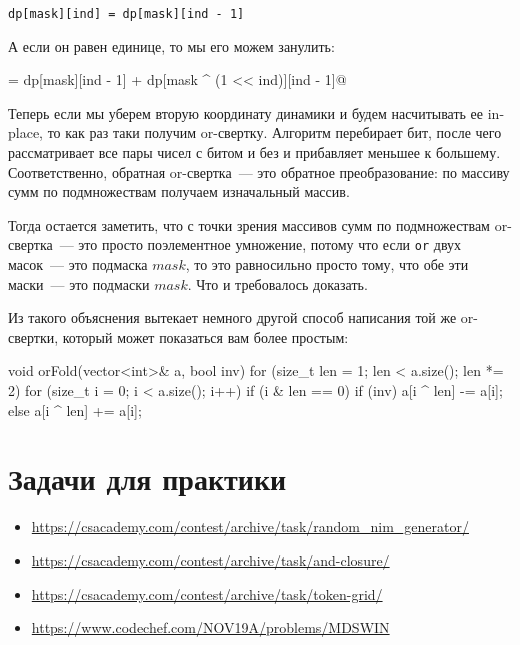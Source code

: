 \verb^dp[mask][ind] = dp[mask][ind - 1]^

А если он равен единице, то мы его можем занулить:

\verb@dp[mask][ind] = dp[mask][ind - 1] + dp[mask ^ (1 << ind)][ind - 1]@

Теперь если мы уберем вторую координату динамики и будем насчитывать ее in-place, то как раз таки получим or-свертку. Алгоритм перебирает бит, после чего рассматривает все пары чисел с битом и без и прибавляет меньшее к большему. Соответственно, обратная or-свертка~--- это обратное преобразование: по массиву сумм по подмножествам получаем изначальный массив.

Тогда остается заметить, что с точки зрения массивов сумм по подмножествам or-свертка~--- это просто поэлементное умножение, потому что если \verb+or+ двух масок~--- это подмаска $mask$, то это равносильно просто тому, что обе эти маски~--- это подмаски $mask$.
Что и требовалось доказать.

Из такого объяснения вытекает немного другой способ написания той же or-свертки, который может показаться вам более простым:

\begin{code}
void orFold(vector<int>& a, bool inv) {
    for (size_t len = 1; len < a.size(); len *= 2) {
        for (size_t i = 0; i < a.size(); i++) {
            if (i & len == 0) {
                if (inv) {
                    a[i ^ len] -= a[i];
                } else {
                    a[i ^ len] += a[i];
                }
            }
        }
    }
}
\end{code}


\section{Задачи для практики}

\begin{itemize}
 
    \item \href{https://csacademy.com/contest/archive/task/random_nim_generator/}{https://csacademy.com/contest/archive/task/random\_nim\_generator/}

    \item \href{https://csacademy.com/contest/archive/task/and-closure/}{https://csacademy.com/contest/archive/task/and-closure/}

    \item \href{https://csacademy.com/contest/archive/task/token-grid/}{https://csacademy.com/contest/archive/task/token-grid/}

    \item \href{https://www.codechef.com/NOV19A/problems/MDSWIN}{https://www.codechef.com/NOV19A/problems/MDSWIN}   
\end{itemize}

